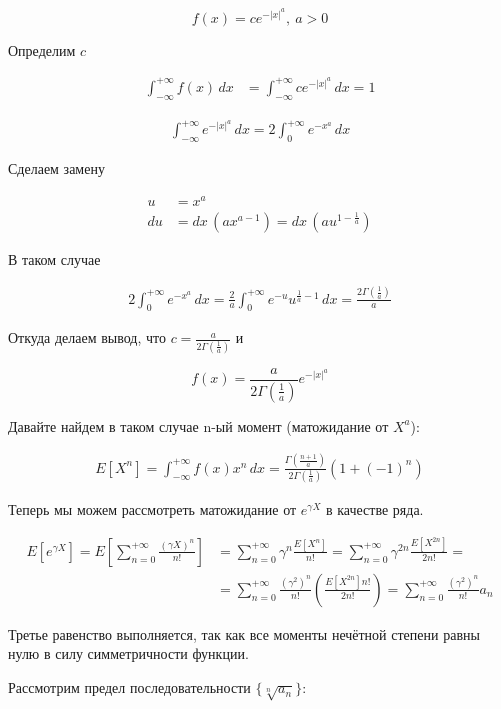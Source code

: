 \documentclass[12pt, a4paper]{article}
\theoremstyle{remark}
\newcommand{\expx}[1]{e^{-|x|^{#1}}}
\newcommand{\expxpoz}[1]{e^{-x^{#1}}}
\newcommand{\infint}[1]{\int_{-\infty}^{+\infty} #1 \, dx}
\newcommand{\infintpoz}[1]{\int_{0}^{+\infty} #1 \, dx}
\begin{document}
$$f(x) = c \expx{a},\ a > 0$$

Определим $c$

\begin{align*}
    \infint{f(x)} &= \infint{c\expx{a}} = 1
\end{align*}

\begin{align*}
    \infint{\expx{a}} = 2\infintpoz{\expxpoz{a}}
\end{align*}

Сделаем замену

\begin{align*}
    u &= x^a \\
    du &= dx\,(a x^{a - 1}) = dx\,(a u^{1 - \frac{1}{a}})
\end{align*}

В таком случае

\begin{align*}
    2\infintpoz{\expxpoz{a}} = \frac{2}{a} \infintpoz{e^{-u}u^{\frac{1}{a} - 1}} = \frac{2\Gamma(\frac{1}{a})}{a}
\end{align*}

Откуда делаем вывод, что $c = \frac{a}{2\Gamma(\frac{1}{a})}
$ и 

$$f(x) = \frac{a}{2\Gamma(\frac{1}{a})} \expx{a}$$

Давайте найдем в таком случае n-ый момент (матожидание от $X^a$): 

\begin{align*}
    E[X^n] = \infint{f(x) x^n} = \frac{\Gamma(\frac{n + 1}{a})}{2\Gamma(\frac{1}{a})} (1 + (-1)^n)
\end{align*}

Теперь мы можем рассмотреть матожидание от $e^{\gamma X}$ в качестве ряда.

\begin{align*}
    E[e^{\gamma X}] = E\left[\sum_{n = 0}^{+\infty}\frac{(\gamma X)^n}{n!}\right] &= \sum_{n = 0}^{+\infty}\gamma^n\frac{E[X^n]}{n!} = \sum_{n = 0}^{+\infty}\gamma^{2n}\frac{E[X^{2n}]}{2n!} =\\
    &= \sum_{n = 0}^{+\infty}\frac{(\gamma^2)^{n}}{n!}\left(\frac{E[X^{2n}]n!}{2n!}\right) = \sum_{n = 0}^{+\infty}\frac{(\gamma^2)^{n}}{n!} a_n
\end{align*}

Третье равенство выполняется, так как все моменты нечётной степени равны нулю в силу симметричности функции.

Рассмотрим предел последовательности $\{\sqrt[n]{a_n}\}$:
\end{document}
